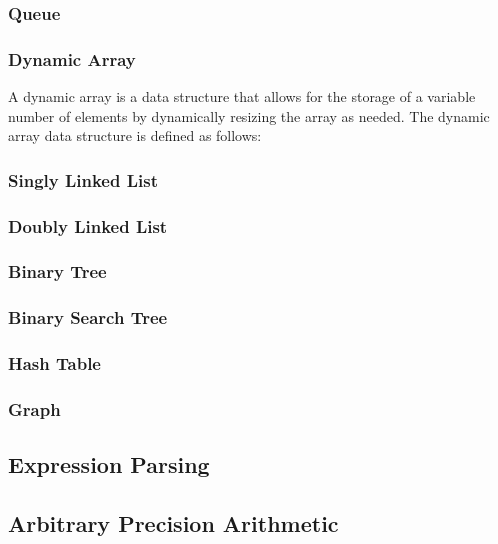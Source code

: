 \documentclass[a4paper,oneside,10pt]{article}
\theoremstyle{definition}
\begin{document}
\subsubsection{Queue}

\subsubsection{Dynamic Array}

A dynamic array is a data structure that allows for the storage of a variable number of elements by dynamically resizing the array as needed. The dynamic array data structure is defined as follows: \newline

\subsubsection{Singly Linked List}

\subsubsection{Doubly Linked List}

\subsubsection{Binary Tree}

\subsubsection{Binary Search Tree}

\subsubsection{Hash Table}

\subsubsection{Graph}

\subsection{Expression Parsing}

\subsection{Arbitrary Precision Arithmetic}
\end{document}
